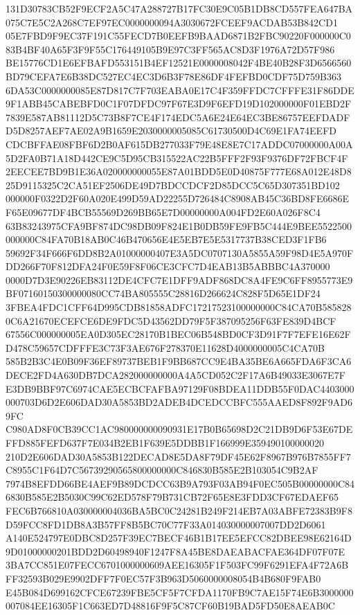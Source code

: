 \documentclass[UTF8,fontset=fandol,zihao=-4,a4paper]{ctexart}
\begin{document}
{{131D30783CB52F9ECF2A5C47A288727B17FC30E9C05B1DB8CD557FEA647BA075C7E5C2A268C7EF97EC0000000094A3030672FCEEF9ACDAB53B842CD1
05E7FBD9F9EC37F191C55FECD7B0EEFB9BAAD6871B2FBC90220F000000C083B4BF40A65F3F9F55C176449105B9E97C3FF565AC8D3F1976A72D57F986
BE15776CD1E6EFBAFD553151B4EF12521E0000008042F4BE40B28F3D6566560BD79CEFA7E6B38DC527EC4EC3D6B3F78E86DF4FEFBD0CDF75D759B363
6DA53C0000000085E87D817C7F703EABA0E17C4F359FFDC7CFFFE31F86DDE9F1ABB45CABEBFD0C1F07DFDC97F67E3D9F6EFD19D102000000F01EBD2F
7839E587AB81112D5C73B8F7CE4F174EDC5A6E24E64EC3BE86757EEFDADFD5D8257AEF7AE02A9B1659E2030000005085C61730500D4C69E1FA74EEFD
CDCBFFAE08FBF6D2B0AF615DB277033F79E48E8E7C17ADDC07000000A00A5D2FA0B71A18D442CE9C5D95CB315522AC22B5FFF2F93F9376DF72FBCF4F
2EECEE7BD9B1E36A020000000055E87A01BDD5E0D40875F777E68A012E48D825D9115325C2CA51EF2506DE49D7BDCCDCF2D85DCC5C65D307351BD102
000000F0322D2F60A020E499D59AD22255D726484C8908AB45C36BD8FE6686EF65E09677DF4BCB55569D269BB65E7D00000000A004FD2E60A026F8C4
63B83243975CFA9BF874DC98DB09F824E1B0DB59FE9FB5C444E9BEE5522500000000C84FA70B18AB0C46B470656E4E5EB7E5E5317737B38CED3F1FB6
59692F34F666F6DD8B2A01000000407E3A5DC0707130A5855A59F98D4E5A970FDD266F70F812DFA24F0E59F8F06CE3CFC7D4EAB13B5ABBBC4A370000
0000D7D3E90226EB83112DE4CFC7E1DFF9ADF868DC8A4FE9C6FF8955773E9BF07160150300000080CC74BA805555C28816D266624C828F5D65E1DF24
3FBEA4FDC1CFF64D995CDB81858ADFC17217523100000000C84CA70B5858280C6A21670ECEFCE6DE9FDC5D43562DD79F5F387095256F63FE839D4BCF
67556C000000005EA0D305EC28170B1BEC06B548BD0CF3D91F7F7EFE16E62FD478C59657CDFFFE3C73F3AE676F278370E11628D4000000005C4CA70B
585B2B3C4E0B09F36EF89737BEB1F9BB687CC9E4BA35BE6A665FDA6F3CA6DECE2FD4A630DB7DCA282000000000A4A5CD052C2F17A6B49033E3067E7F
E3DB9BBF97C6974CAE5ECBCFAFBA97129F08BDEA11DDB55F0DAC4403000000703D6D2E606DAD30A5853BD2ADEB4DCEDCCBFC555AAED8F892F9AD69FC
C980AD8F0CB39CC1AC980000000090931E17B0B65698D2C21DB9D6F53E67DEFFD885FEFD637F7E034B2EB1F639E5DDBB1F166999E359490100000020
210D2E606DAD30A5853B122DECAD8E5DA8F79DF45E62F8967B976B7855FF7C8955C1F64D7C56739290565800000000C846830B585E2B103054C9B2AF
7974B8EFDD66BE4AEF9B89DCDCC63B9A793F03AB94F0EC505B00000000C846830B585E2B5030C99C62ED578F79B731CB72F65E8E3FDD3CF67EDAEF65
FEC6B766810A030000004036BA5BC0C24281B249F214EB7A03ABFE72383B9F8D59FCC8FD1DB8A3B57FF8B5BC70C77F33A014030000007007DD2D6061
A140E524797E0DBC8D257F39EC7BECF46B1B17EE5EFCC82DBEE98E62164D9D01000000201BDD2D60498940F1247F8A45BE8DAEABACFAE364DF07F07E
3BA7CC851E07FECC6701000000609AEE16305F1F503FC99F6291EFA4F72A6BFF32593B029E9902DFF7F0EC57F3B963D5060000008054B4B680F9FAB0
E45B084D699162CFCE67239FBE5CF5F7CFDA1170FB9C7AE15F74E6B3000000007084EE16305F1C663ED7D48816F9F5C87CF60B19BAD5FD50E8AEAB0C
}}
\end{document}
